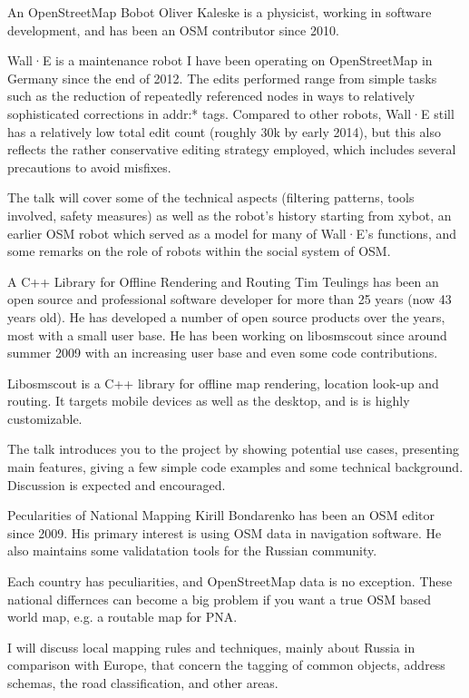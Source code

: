 %
{An OpenStreetMap Bobot}%
{Oliver Kaleske is a physicist, working in software development, and has been an OSM contributor since 2010.}%
{Wall·E is a maintenance robot I have been operating on OpenStreetMap in Germany since the end of 2012. The edits performed range from simple tasks such as the reduction of repeatedly referenced nodes in
ways to relatively sophisticated corrections in addr:* tags. Compared to other robots, Wall·E still has a relatively low total edit count (roughly 30k by early 2014), but this also
reflects the rather conservative editing strategy employed, which includes several precautions to avoid misfixes.

The talk will cover some of the technical aspects (filtering patterns, tools involved, safety measures) as well as the robot's history starting from xybot, an earlier OSM robot which served as
a model for many of Wall·E's functions, and some remarks on the role of robots within the social system of OSM.}

%
{A C++ Library for Offline Rendering and Routing}%
{Tim Teulings has been an open source and professional software developer for more than 25 years (now 43 years old). He has developed a number of open source products over the years, most with a small user base. He has been working on libosmscout since around summer 2009 with an increasing user base and even some code contributions.}%
{Libosmscout is a C++ library for offline map rendering, location look-up and routing. It targets mobile devices as well as the desktop, and is is highly customizable.

The talk introduces you to the project by showing potential use cases, presenting main features, giving a few simple code examples and some technical background. Discussion is expected and encouraged.}


%
{Pecularities of National Mapping}%
{Kirill Bondarenko has been an OSM editor since 2009. His primary interest is using OSM data in navigation software. He also maintains some validatation tools for the Russian community.}%
{Each country has peculiarities, and OpenStreetMap data is no exception. These national differnces can become a big problem  if you want a true OSM based world map, e.g. a routable map for PNA.

I will discuss local mapping rules and techniques, mainly about Russia in comparison with Europe, that concern the tagging of common objects, address schemas, the road classification, and other areas.}


